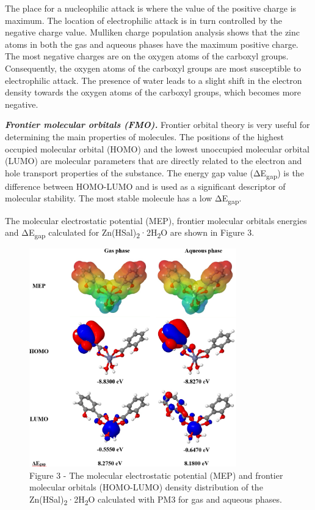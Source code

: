 \begin{multicols}{2}
The place for a nucleophilic attack is where the value of the positive
charge is maximum. The location of electrophilic attack is in turn
controlled by the negative charge value. Mulliken charge population
analysis shows that the zinc atoms in both the gas and aqueous phases
have the maximum positive charge. The most negative charges are on the
oxygen atoms of the carboxyl groups. Consequently, the oxygen atoms of
the carboxyl groups are most susceptible to electrophilic attack. The
presence of water leads to a slight shift in the electron density
towards the oxygen atoms of the carboxyl groups, which becomes more
negative.

\emph{{\bfseries Frontier molecular orbitals (FMO).}} Frontier orbital
theory is very useful for determining the main properties of molecules.
The positions of the highest occupied molecular orbital (HOMO) and the
lowest unoccupied molecular orbital (LUMO) are molecular parameters that
are directly related to the electron and hole transport properties of
the substance. The energy gap value (ΔE\textsubscript{gap}) is the
difference between HOMO-LUMO and is used as a significant descriptor of
molecular stability. The most stable molecule has a low
ΔE\textsubscript{gap}.

The molecular electrostatic potential (MEP), frontier molecular orbitals
energies and ΔE\textsubscript{gap} calculated for
Zn(HSal)\textsubscript{2}·2H\textsubscript{2}O are shown in Figure 3.
\end{multicols}

\begin{figure}[H]
	\centering
	\includegraphics[width=0.8\textwidth]{assets/41}
	\caption*{Figure 3 - The molecular electrostatic potential (MEP) and frontier molecular orbitals (HOMO-LUMO) density distribution of the Zn(HSal)\textsubscript{2}·2H\textsubscript{2}O calculated with PM3 for gas and aqueous phases.}
\end{figure}

